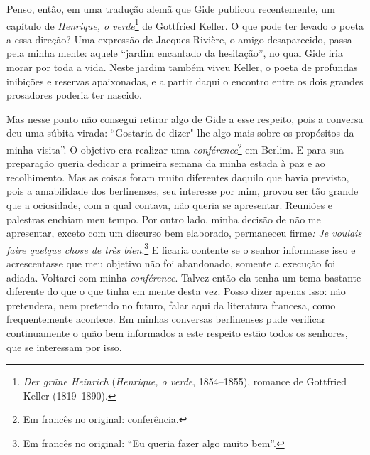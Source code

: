 Penso, então, em uma tradução alemã que Gide publicou recentemente, um
capítulo de \emph{Henrique, o verde}\footnote{\emph{Der grüne
  Heinrich} (\emph{Henrique, o verde}, 1854--1855), romance de Gottfried Keller
  (1819--1890). \versal{[N.~O.]}} de Gottfried Keller. O que pode ter levado o poeta a
essa direção? Uma expressão de Jacques Rivière, o amigo desaparecido,
passa pela minha mente: aquele ``jardim encantado da hesitação'', no
qual Gide iria morar por toda a vida. Neste jardim também viveu Keller,
o poeta de profundas inibições e reservas apaixonadas, e a partir daqui
o encontro entre os dois grandes prosadores poderia ter nascido.

Mas nesse ponto não consegui retirar algo de Gide a esse
respeito, pois a conversa deu uma súbita virada: ``Gostaria de dizer"-lhe
algo mais sobre os propósitos da minha visita''. O objetivo era realizar
uma \emph{conférence}\footnote{Em francês no original: conferência. \versal{[N.~T.]}} em Berlim. E para sua preparação queria dedicar a
primeira semana da minha estada à paz e ao recolhimento. Mas as
coisas foram muito diferentes daquilo que havia previsto, pois a
amabilidade dos berlinenses, seu interesse por mim, provou ser tão
grande que a ociosidade, com a qual contava, não queria se apresentar.
Reuniões e palestras enchiam meu tempo. Por
outro lado, minha decisão de não me apresentar, exceto com um discurso
bem elaborado, permaneceu firme\emph{: Je voulais faire quelque chose de
très bien}.\footnote{Em francês no original: ``Eu queria fazer algo muito bem''. \versal{[N.~T.]}}
E ficaria contente se o senhor informasse isso e acrescentasse que
meu objetivo não foi abandonado, somente a execução foi adiada. Voltarei com minha \emph{conférence}.
Talvez então ela tenha um tema bastante diferente do que o que tinha em
mente desta vez. Posso dizer apenas isso: não pretendera, nem pretendo
no futuro, falar aqui da literatura francesa, como frequentemente
acontece. Em minhas conversas berlinenses pude verificar continuamente
o quão bem informados a este respeito estão todos os senhores, que se
interessam por isso.

